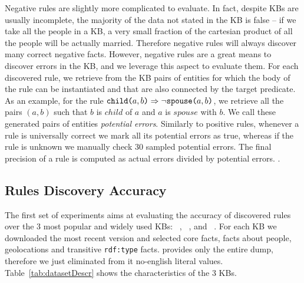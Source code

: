Negative rules are slightly more complicated to evaluate. In fact, despite KBs are usually incomplete, the majority of the data not stated in the KB is false -- if we take all the people in a KB, a very small fraction of the cartesian product of all the people will be actually married. Therefore negative rules will always discover many correct negative facts. However, negative rules are a great means to discover errors in the KB, and we leverage this aspect to evaluate them. For each discovered rule, we retrieve from the KB pairs of entities for which the body of the rule can be instantiated and that are also connected by the target predicate. As an example, for the rule $\texttt{child(}a,b\texttt{)} \Rightarrow \neg \texttt{spouse(}a,b\texttt{)}$, we retrieve all the pairs $(a,b)$ such that $b$ is $child$ of $a$ and $a$ is $spouse$ with $b$. We call these generated pairs of entities \emph{potential errors}. Similarly to positive rules, whenever a rule is universally correct we mark all its potential errors as true, whereas if the rule is unknown we manually check 30 sampled potential errors. The final precision of a rule is computed as actual errors divided by potential errors.
.

\subsection{Rules Discovery Accuracy} \label{sec:gen_evaluation}
The first set of experiments aims at evaluating the accuracy of discovered rules over the 3 most popular and widely used KBs: \dbpedia~\cite{bizer2009dbpedia}, \yago~\cite{suchanek2007yago}, and \wikidata~\cite{vrandevcic2014wikidata}. For each KB we downloaded the most recent version and selected core facts, facts about people, geolocations and transitive \texttt{rdf:type} facts. \wikidata provides only the entire dump, therefore we just eliminated from it no-english literal values. Table~\ref{tab:datasetDescr} shows the characteristics of the 3 KBs.

